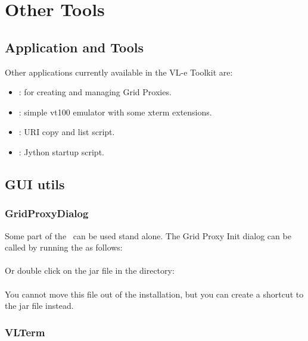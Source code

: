 %
%

\chapter{Other Tools}
\label{chap:other_tools}

\section{Application and Tools} 

Other applications currently available in the VL-e Toolkit are:

\begin{itemize}
  \item {}: for creating and managing Grid Proxies. 
  \item {}:		    simple vt100 emulator with some
  xterm extensions.  
  \item {}:		URI copy and list script. 
  \item {}:		Jython startup script. 
\end{itemize}

\section{GUI utils}

\subsection{GridProxyDialog}

Some part of the \vbrowser\ can be used stand alone. 
The Grid Proxy Init dialog can be called by running the
 as follows:\\

	\tab {}\\

Or double click on the jar file in the  directory:\\

	\tab {}\\
	
You cannot move this file out of the installation, but you can create a shortcut
to the jar file instead. 

\subsection{VLTerm}
\label{section:vlterm}

